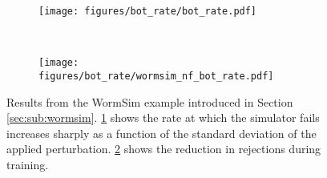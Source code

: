 \begin{figure}[t]
\centering
    \begin{subfigure}[t]{0.24\textwidth}
        \texttt{[image: figures/bot\_rate/bot\_rate.pdf]}
        \vspace{-0.8cm}
        \caption{}
        \label{fig:wormsim:bot_rate}
    \end{subfigure}%
    ~%
    \begin{subfigure}[t]{0.24\textwidth}
        \texttt{[image: figures/bot\_rate/wormsim\_nf\_bot\_rate.pdf]}
        \vspace{-0.8cm}
        \caption{}
        \label{fig:wormsim:bot_nf_rate}
    \end{subfigure}
\vspace{-0.5cm}
\caption{Results from the WormSim example introduced in Section \ref{sec:sub:wormsim}.
\ref{fig:wormsim:bot_rate} shows the rate at which the simulator fails increases sharply as a function of the standard deviation of the applied perturbation. 
\ref{fig:wormsim:bot_nf_rate} shows the reduction in rejections during training.
}
\label{fig:bot}
\end{figure}